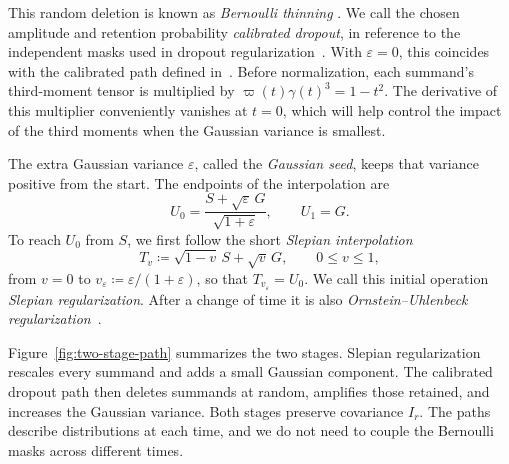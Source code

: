 \documentclass[11pt,letterpaper]{article}
\theoremstyle{remark}
\begin{document}
This random deletion is known as \emph{Bernoulli thinning}
\cite{Renyi1956,SteutelHarn1979,LastPenrose2017}. We call the
chosen amplitude and retention probability \emph{calibrated dropout},
in reference to the independent masks used in dropout regularization~\cite{Dropout2014}.
With \(\varepsilon=0\), this coincides with the calibrated path
defined in~\cite[Section~4]{AL}. Before normalization, each summand's third-moment tensor is multiplied
by \(\varpi(t)\gamma(t)^3=1-t^2\). The derivative of this multiplier
conveniently vanishes at \(t=0\), which will help control the impact of
the third moments when the Gaussian variance is smallest.

The extra Gaussian variance \(\varepsilon\), called the
\emph{Gaussian seed}, keeps that variance positive from the start.
The endpoints of the interpolation are
\[
 U_0=\frac{S+\sqrt\varepsilon\,G}{\sqrt{1+\varepsilon}},
 \qquad U_1=G.
\]
To reach \(U_0\) from \(S\), we first follow the short
\emph{Slepian interpolation}
\[
 T_v\coloneqq\sqrt{1-v}\,S+\sqrt v\,G,\qquad 0\le v\le1,
\]
from \(v=0\) to \(v_\varepsilon\coloneqq
\varepsilon/(1+\varepsilon)\), so that \(T_{v_\varepsilon}=U_0\).
We call this initial operation \emph{Slepian regularization}.
After a change of time it is also
\emph{Ornstein--Uhlenbeck regularization}~\cite[Theorem~4.12]{Nourdin2012}.

Figure~\ref{fig:two-stage-path} summarizes the two stages. Slepian
regularization rescales every summand and adds a small Gaussian component.
The calibrated dropout path then deletes summands at random, amplifies
those retained, and increases the Gaussian variance. Both stages preserve
covariance \(I_r\). The paths describe distributions at each time, and
we do not need to couple the Bernoulli masks across different times.
\end{document}
